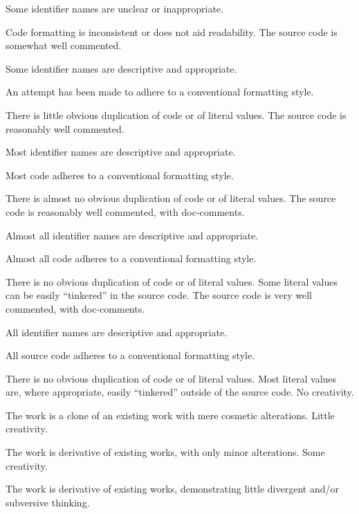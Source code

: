\documentclass{../../fal_assignment}
\begin{document}
\begin{markingrubric}
            \par Some identifier names are unclear or inappropriate.
            \par Code formatting is inconsistent or does not aid readability.
        \grade The source code is somewhat well commented.
            \par Some identifier names are descriptive and appropriate.
            \par An attempt has been made to adhere to a conventional formatting style.
             \par There is little obvious duplication of code or of literal values.           
        \grade The source code is reasonably well commented.
            \par Most identifier names are descriptive and appropriate.
            \par Most code adheres to a conventional formatting style.
             \par There is almost no obvious duplication of code or of literal values.   
        \grade The source code is reasonably well commented, with doc-comments.
            \par Almost all identifier names are descriptive and appropriate.
            \par Almost all code adheres to a conventional formatting style.
             \par There is no obvious duplication of code or of literal values. Some literal values can be easily ``tinkered'' in the source code. 
        \grade The source code is very well commented, with doc-comments.
            \par All identifier names are descriptive and appropriate.
            \par All source code adheres to a conventional formatting style.
             \par There is no obvious duplication of code or of literal values. Most literal values are, where appropriate, easily ``tinkered'' outside of the source code.  
%
        \grade\fail No creativity.
            \par The work is a clone of an existing work with mere cosmetic alterations.
        \grade Little creativity.
            \par The work is derivative of existing works, with only minor alterations.
        \grade Some creativity.
            \par The work is derivative of existing works, demonstrating little divergent and/or subversive thinking.

\end{markingrubric}
\end{document}
